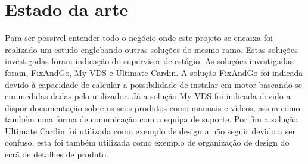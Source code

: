 





\section{Estado da arte}
Para ser possível entender todo o negócio onde este projeto se encaixa foi realizado um estudo
englobando outras soluções do mesmo ramo. Estas soluções investigadas foram indicação do supervisor
de estágio. As soluções investigadas foram, FixAndGo, My VDS e Ultimate Cardin. A solução FixAndGo 
foi indicada devido à capacidade de calcular a possibilidade de instalar em motor baseando-se em
medidas dadas pelo utilizador. Já a solução My VDS foi indicada devido a dispor documentação sobre
os seus produtos como manuais e vídeos, assim como também uma forma de comunicação com a equipa de suporte.
Por fim a solução Ultimate Cardin foi utilizada como exemplo de design a não seguir devido a ser confuso, 
esta foi também utilizada como exemplo de organização de design do ecrã de detalhes de produto.



\newpage









\newpage



\newpage



\newpage



\newpage



\newpage



\newpage



\newpage







\newpage

